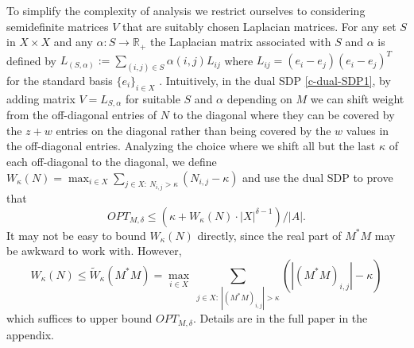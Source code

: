 To simplify the complexity of analysis we restrict ourselves to considering
semidefinite matrices $V$ that are suitably chosen Laplacian matrices.
For any set $S$ in $X\times X$ and any $\alpha:S\rightarrow \mathbb{R}_+$
the Laplacian matrix associated with $S$ and $\alpha$
is defined by $L_{(S,\alpha)}:=\sum_{(i,j)\in S}\alpha(i,j) L_{ij}$ where
$L_{ij}=(e_i-e_j)(e_i-e_j)^T$ for the standard basis $\{e_i\}_{i\in X}$ .
Intuitively, in the dual SDP \eqref{c-dual-SDP1}, by adding matrix $V=L_{S,\alpha}$ for
suitable $S$ and $\alpha$ depending on $M$ we can shift weight from the
off-diagonal
entries of $N$ to the diagonal where they can be covered by the
$z+w$ entries on the diagonal rather than being covered by the $w$ values in
the off-diagonal entries.  
Analyzing the choice where we shift all but the last $\kappa$ of each
off-diagonal to the diagonal, we define
$W_\kappa(N)=\max_{i\in X} \sum_{j\in X:\ N_{i,j}> \kappa} (N_{i,j}-\kappa)$
and use the dual SDP to prove that
\begin{equation}
OPT_{M,\delta}\le (\kappa+W_\kappa(N)\cdot |X|^{\delta-1})/|A|.
\end{equation}
It may not be easy to bound $W_\kappa(N)$ directly,
since the real part of $M^{*}M$ may be awkward to work with.  However,
$$W_\kappa(N)\le \tilde W_\kappa(M^*M)=\max_{i\in X}\ \sum_{j\in X:\ |(M^{*}M)_{i,j}|> \kappa} (|(M^{*}M)_{i,j}|-\kappa)$$
which suffices to upper bound $OPT_{M,\delta}$.  Details are in the full paper in the appendix.

